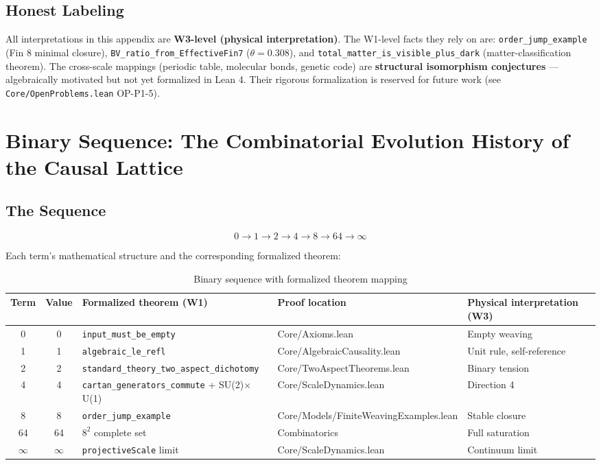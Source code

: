 \documentclass[aps,prd,twocolumn,nofootinbib,floatfix]{revtex4-2}
\begin{document}
\subsection{Honest Labeling}

All interpretations in this appendix are \textbf{W3-level (physical interpretation)}. The W1-level facts they rely on are: \texttt{order\_jump\_example} (Fin 8 minimal closure), \texttt{BV\_ratio\_from\_EffectiveFin7} ($\theta = 0.308$), and \texttt{total\_matter\_is\_visible\_plus\_dark} (matter-classification theorem). The cross-scale mappings (periodic table, molecular bonds, genetic code) are \textbf{structural isomorphism conjectures} --- algebraically motivated but not yet formalized in Lean 4. Their rigorous formalization is reserved for future work (see \texttt{Core/OpenProblems.lean} OP-P1-5).

\section{Binary Sequence: The Combinatorial Evolution History of the Causal Lattice}

\subsection{The Sequence}

\[
\boxed{
0 \longrightarrow 1 \longrightarrow 2 \longrightarrow 4 \longrightarrow 8 \longrightarrow 64 \longrightarrow \infty
}
\]

Each term's mathematical structure and the corresponding formalized theorem:

\begin{table}[h]
\centering
\begin{tabular}{|c|c|l|l|l|}
\hline
Term & Value & Formalized theorem (W1) & Proof location & Physical interpretation (W3) \\
\hline
0 & 0 & \texttt{input\_must\_be\_empty} & Core/Axioms.lean & Empty weaving \\
1 & 1 & \texttt{algebraic\_le\_refl} & Core/AlgebraicCausality.lean & Unit rule, self-reference \\
2 & 2 & \texttt{standard\_theory\_two\_aspect\_dichotomy} & Core/TwoAspectTheorems.lean & Binary tension \\
4 & 4 & \texttt{cartan\_generators\_commute} + SU(2)$\times$U(1) & Core/ScaleDynamics.lean & Direction 4 \\
8 & 8 & \texttt{order\_jump\_example} & Core/Models/FiniteWeavingExamples.lean & Stable closure \\
64 & 64 & $8^2$ complete set & Combinatorics & Full saturation \\
$\infty$ & $\infty$ & \texttt{projectiveScale} limit & Core/ScaleDynamics.lean & Continuum limit \\
\hline
\end{tabular}
\caption{Binary sequence with formalized theorem mapping}
\end{table}
\end{document}
